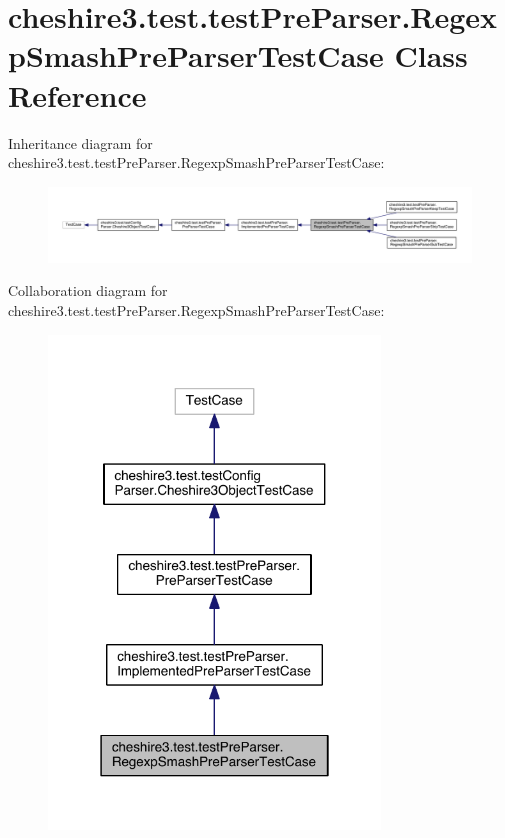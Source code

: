 \hypertarget{classcheshire3_1_1test_1_1test_pre_parser_1_1_regexp_smash_pre_parser_test_case}{\section{cheshire3.\-test.\-test\-Pre\-Parser.\-Regexp\-Smash\-Pre\-Parser\-Test\-Case Class Reference}
\label{classcheshire3_1_1test_1_1test_pre_parser_1_1_regexp_smash_pre_parser_test_case}
}


Inheritance diagram for cheshire3.\-test.\-test\-Pre\-Parser.\-Regexp\-Smash\-Pre\-Parser\-Test\-Case\-:
\nopagebreak
\begin{figure}[H]
\begin{center}
\leavevmode
\includegraphics[width=350pt]{classcheshire3_1_1test_1_1test_pre_parser_1_1_regexp_smash_pre_parser_test_case__inherit__graph}
\end{center}
\end{figure}


Collaboration diagram for cheshire3.\-test.\-test\-Pre\-Parser.\-Regexp\-Smash\-Pre\-Parser\-Test\-Case\-:
\nopagebreak
\begin{figure}[H]
\begin{center}
\leavevmode
\includegraphics[width=250pt]{classcheshire3_1_1test_1_1test_pre_parser_1_1_regexp_smash_pre_parser_test_case__coll__graph}
\end{center}
\end{figure}
